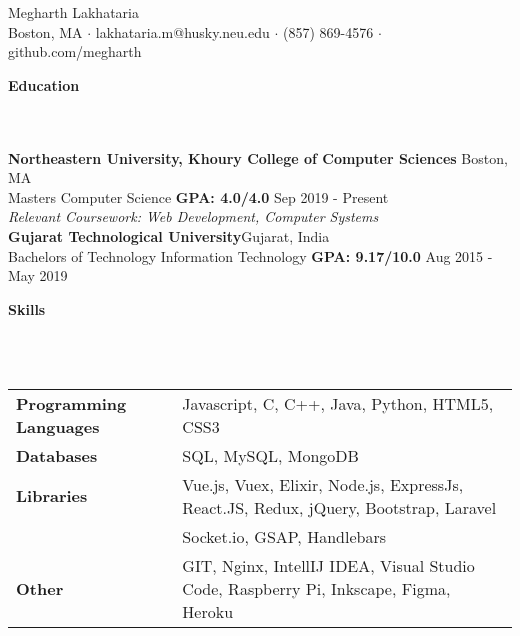 \documentclass[]{article}
\newcommand{\lineunder} {
    \vspace*{-8pt} \\
    \hrulefill \\
}
\newcommand{\header} [1] {
    {\vspace*{6pt} \fontsize{12}{12}\selectfont \textbf{#1}}
     \lineunder
}
\begin{document}
\vspace*{-40pt}

    

\begin{center}
	{\LARGE {Megharth Lakhataria}}\\
	Boston, MA $\cdot$ lakhataria.m@husky.neu.edu $\cdot$ (857) 869-4576 $\cdot$ github.com/megharth\\
\end{center}

\header{Education}
\hspace{1mm}
\textbf{Northeastern University, Khoury College of Computer Sciences}
\hfill
Boston, MA\\
\hspace{1mm}
Masters Computer Science \textbf{GPA: 4.0/4.0} \hfill Sep 2019 - Present\\
\hspace{1mm}
\textit{Relevant Coursework: Web Development, Computer Systems} \\
\vspace{2mm}
\hspace{1mm}
\textbf{Gujarat Technological University}\hfill Gujarat, India\\
\hspace{1mm}
Bachelors of Technology Information Technology \textbf{GPA: 9.17/10.0} \hfill
Aug 2015 - May 2019\\
\vspace{2mm}


\header{Skills}
\vspace{1mm}
\begin{tabular}{ l l }
	\textbf{Programming Languages} & Javascript, C, C++, Java, Python, HTML5, CSS3            \\
	\textbf{Databases}             & SQL, MySQL, MongoDB                                      \\
    
    \textbf{Libraries}             & Vue.js, Vuex, Elixir, Node.js, ExpressJs, React.JS,
    Redux, jQuery, Bootstrap, Laravel  \\
                          & Socket.io, GSAP, Handlebars \\
    
    \textbf{Other}                & GIT, Nginx, IntellIJ IDEA, Visual Studio Code,
    Raspberry Pi, Inkscape, Figma, Heroku \\          
\end{tabular}
\vspace{2mm}
\end{document}
